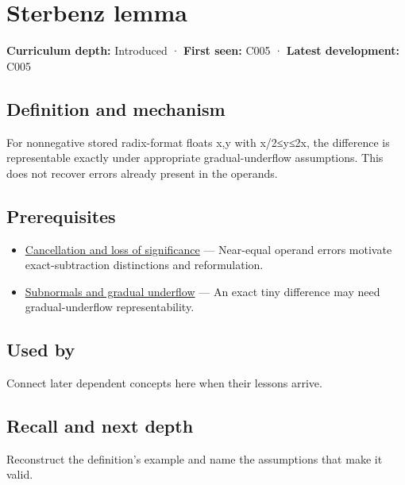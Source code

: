 \hypertarget{appendix-399b7ad53f39}{}
\section{Sterbenz lemma}\label{appendix-399b7ad53f39-sterbenz-lemma}

\textbf{Curriculum depth:} Introduced · \textbf{First seen:} C005 · \textbf{Latest development:} C005

\subsection{Definition and mechanism}\label{appendix-399b7ad53f39-definition-and-mechanism}

For nonnegative stored radix-format floats x,y with x/2≤y≤2x, the difference is representable exactly under appropriate gradual-underflow assumptions. This does not recover errors already present in the operands.

\subsection{Prerequisites}\label{appendix-399b7ad53f39-prerequisites}

\begin{itemize}
\tightlist
\item
  \hyperref[appendix-a2773a6a2f9d]{Cancellation and loss of significance} --- Near-equal operand errors motivate exact-subtraction distinctions and reformulation.
\item
  \hyperref[appendix-00a6e044c437]{Subnormals and gradual underflow} --- An exact tiny difference may need gradual-underflow representability.
\end{itemize}

\subsection{Used by}\label{appendix-399b7ad53f39-used-by}

Connect later dependent concepts here when their lessons arrive.

\subsection{Recall and next depth}\label{appendix-399b7ad53f39-recall-and-next-depth}

Reconstruct the definition's example and name the assumptions that make it valid.


